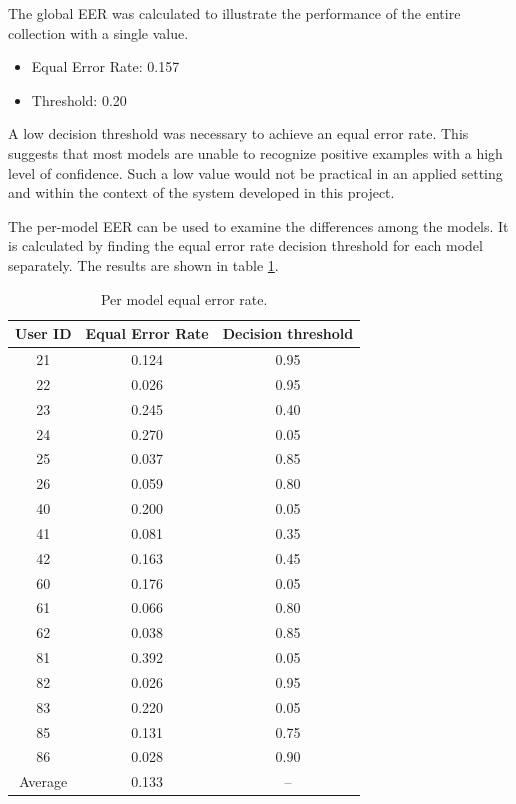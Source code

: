 The global EER was calculated to illustrate the performance of the entire collection with a single value.
\begin{itemize}
	\item[] Equal Error Rate: 0.157
	\item[] Threshold: 0.20
\end{itemize}
A low decision threshold was necessary to achieve an equal error rate. This suggests that most models are unable to recognize positive examples with a high level of confidence. Such a low value would not be practical in an applied setting and within the context of the system developed in this project. 

The per-model EER can be used to examine the differences among the models.
It is calculated by finding the equal error rate decision threshold for each model separately.
The results are shown in table \ref{table:EER_separate}.
\begin{center}
	\begin{table}[H]
		\begin{center}
			\begin{tabular}{ |c|c|c| } 
				\hline
				User ID & Equal Error Rate & Decision threshold \\
				\hline
				\hline
				21 & 0.124 & 0.95 \\
				\hline
				22 & 0.026 & 0.95 \\
				\hline
				23 & 0.245 & 0.40 \\
				\hline
				24 & 0.270 & 0.05 \\
				\hline
				25 & 0.037 & 0.85 \\
				\hline
				26 & 0.059 & 0.80 \\
				\hline
				40 & 0.200 & 0.05 \\
				\hline
				41 & 0.081 & 0.35 \\
				\hline
				42 & 0.163 & 0.45 \\
				\hline
				60 & 0.176 & 0.05 \\
				\hline
				61 & 0.066 & 0.80 \\
				\hline
				62 & 0.038 & 0.85 \\
				\hline
				81 & 0.392 & 0.05 \\
				\hline
				82 & 0.026 & 0.95 \\
				\hline
				83 & 0.220 & 0.05 \\
				\hline
				85 & 0.131 & 0.75 \\
				\hline
				86 & 0.028 & 0.90 \\
				\hline
				\hline
				Average & 0.133 & -- \\
				\hline
			\end{tabular}
		\end{center}
		\caption{Per model equal error rate.}
		\label{table:EER_separate}
	\end{table}
\end{center}

